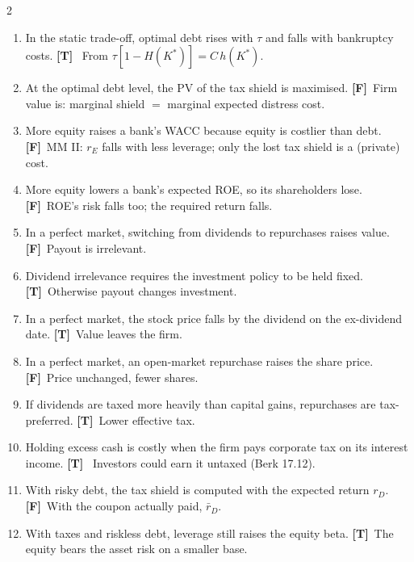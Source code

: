\documentclass[10pt,a4paper]{article}
\newcommand{\T}{\textbf{\color{ok}[T]}~}
\newcommand{\F}{\textbf{\color{wr}[F]}~}
\begin{document}
\begin{multicols}{2}
\begin{enumerate}[label=\arabic*.,start=48,leftmargin=1.6em,itemsep=2pt]
        Their indirect distress costs are high.
  \item In the static trade-off, optimal debt rises with $\tau$ and falls with bankruptcy costs. \T
        From $\tau[1-H(K^*)]=C\,h(K^*)$.
  \item At the optimal debt level, the PV of the tax shield is maximised. \F Firm value is: marginal
        shield $=$ marginal expected distress cost.
  \item More equity raises a bank's WACC because equity is costlier than debt. \F MM II: $r_E$ falls
        with less leverage; only the lost tax shield is a (private) cost.
  \item More equity lowers a bank's expected ROE, so its shareholders lose. \F ROE's risk falls too;
        the required return falls.
  \item In a perfect market, switching from dividends to repurchases raises value. \F Payout is
        irrelevant.
  \item Dividend irrelevance requires the investment policy to be held fixed. \T Otherwise payout
        changes investment.
  \item In a perfect market, the stock price falls by the dividend on the ex-dividend date. \T Value
        leaves the firm.
  \item In a perfect market, an open-market repurchase raises the share price. \F Price unchanged,
        fewer shares.
  \item If dividends are taxed more heavily than capital gains, repurchases are tax-preferred. \T Lower
        effective tax.
  \item Holding excess cash is costly when the firm pays corporate tax on its interest income. \T
        Investors could earn it untaxed (Berk 17.12).
  \item With risky debt, the tax shield is computed with the expected return $r_D$. \F With the
        coupon actually paid, $\bar r_D$.
  \item With taxes and riskless debt, leverage still raises the equity beta. \T The equity bears the
        asset risk on a smaller base.
\end{enumerate}
\end{multicols}
\end{document}
